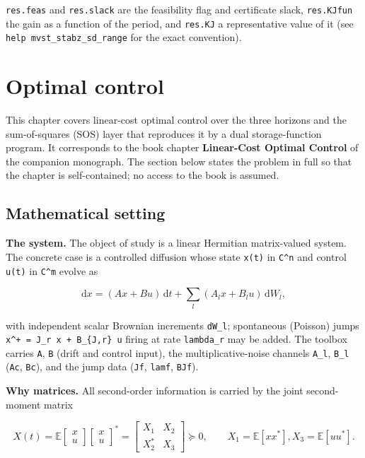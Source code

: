 \documentclass[11pt,oneside]{report}
\newcommand{\code}[1]{\texttt{#1}}
\begin{document}
\code{res.feas} and \code{res.slack} are the feasibility flag and certificate slack,
\code{res.KJfun} the gain as a function of the period, and \code{res.KJ} a representative
value of it (see \code{help mvst\_stabz\_sd\_range} for the exact convention).


\hypertarget{chap:05-optimal-control}{%
\chapter{Optimal control}\label{chap:05-optimal-control}}

This chapter covers linear-cost optimal control over the three horizons and the
sum-of-squares (SOS) layer that reproduces it by a dual storage-function
program. It corresponds to the book chapter \textbf{Linear-Cost Optimal Control} of
the companion monograph. The section below states the problem in full so that
the chapter is self-contained; no access to the book is assumed.

\hypertarget{mathematical-setting}{%
\section{Mathematical setting}\label{mathematical-setting}}

\textbf{The system.} The object of study is a linear Hermitian matrix-valued system.
The concrete case is a controlled diffusion whose state \code{x(t)} in \code{C\^{}n} and
control \code{u(t)} in \code{C\^{}m} evolve as

\[
\mathrm{d}x = (A x + B u)\,\mathrm{d}t
  + \sum_{l} (A_l x + B_l u)\,\mathrm{d}W_l ,
\]

with independent scalar Brownian increments \code{dW\_l}; spontaneous (Poisson) jumps
\code{x\^{}+ = J\_r x + B\_\{J,r\} u} firing at rate \code{lambda\_r} may be added. The toolbox
carries \code{A}, \code{B} (drift and control input), the multiplicative-noise channels
\code{A\_l}, \code{B\_l} (\code{Ac}, \code{Bc}), and the jump data (\code{Jf}, \code{lamf}, \code{BJf}).

\textbf{Why matrices.} All second-order information is carried by the joint
second-moment matrix

\[
X(t) = \mathbb{E}\begin{bmatrix} x \\ u \end{bmatrix}
                    \begin{bmatrix} x \\ u \end{bmatrix}^{*}
     = \begin{bmatrix} X_1 & X_2 \\ X_2^{*} & X_3 \end{bmatrix}
     \succeq 0 ,
\qquad
X_1 = \mathbb{E}[x x^{*}],  X_3 = \mathbb{E}[u u^{*}] .
\]
\end{document}
